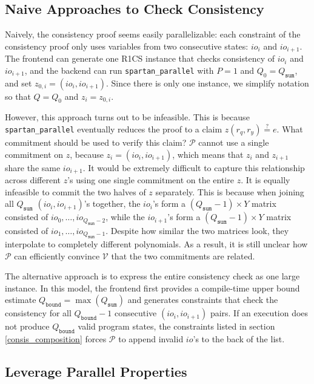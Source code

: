 \documentclass{article}
\newcommand{\code}{\texttt}
\newcommand{\Qbound}{Q_{\mathtt{bound}}}
\newcommand{\Qsum}{Q_{\mathtt{sum}}}
\renewcommand{\P}{\mathcal{P}}
\newcommand{\V}{\mathcal{V}}
\newcommand{\eqq}{\stackrel{?}{=}}
\begin{document}
\subsection{Naive Approaches to Check Consistency}

Naively, the consistency proof seems easily parallelizable: each constraint of the consistency proof only uses variables from two consecutive states: $io_i$ and $io_{i + 1}$. The frontend can generate one R1CS instance that checks consistency of $io_i$ and $io_{i + 1}$, and the backend can run \code{spartan\_parallel} with $P = 1$ and $Q_0 = \Qsum$, and set $z_{0, i} = (io_i, io_{i + 1})$. Since there is only one instance, we simplify notation so that $Q = Q_0$ and $z_i = z_{0, i}$.

However, this approach turns out to be infeasible. This is because \code{spartan\_parallel} eventually reduces the proof to a claim $z(r_q, r_y) \eqq e$. What commitment should be used to verify this claim? $\P$ cannot use a single commitment on $z$, because $z_{i} = (io_i, io_{i + 1})$, which means that $z_i$ and $z_{i+1}$ share the same $io_{i + 1}$. It would be extremely difficult to capture this relationship across different $z$'s using one single commitment on the entire $z$. It is equally infeasible to commit the two halves of $z$ separately. This is because when joining all $\Qsum$ $(io_i, io_{i + 1})$'s together, the $io_i$'s form a $(\Qsum - 1)\times Y$ matrix consisted of $io_0, \dots, io_{\Qsum - 2}$, while the $io_{i + 1}$'s form a $(\Qsum - 1)\times Y$ matrix consisted of $io_1, \dots, io_{\Qsum - 1}$. Despite how similar the two matrices look, they interpolate to completely different polynomials. As a result, it is still unclear how $\P$ can efficiently convince $\V$ that the two commitments are related.
 
The alternative approach is to express the entire consistency check as one large instance. In this model, the frontend first provides a compile-time upper bound estimate $\Qbound = \max(\Qsum)$ and generates constraints that check the consistency for all $\Qbound - 1$ consecutive $(io_i, io_{i + 1})$ pairs. If an execution does not produce $\Qbound$ valid program states, the constraints listed in section \ref{consis_composition} forces $\P$ to append invalid $io$'s to the back of the list.

\subsection{Leverage Parallel Properties}
\end{document}
